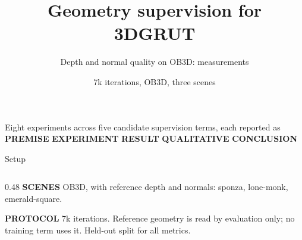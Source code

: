 \documentclass[aspectratio=169,9pt]{beamer}
\title{\bfseries Geometry supervision for 3DGRUT}
\subtitle{Depth and normal quality on OB3D: measurements}
\date{}
\author{7k iterations, OB3D, three scenes}
\makeatletter
\newcommand{\code}[1]{{\ttfamily\fontsize{0.92\f@size}{\f@baselineskip}\selectfont #1}}
\newcommand{\lbl}[1]{\textcolor{lblcol}{\scriptsize\bfseries #1}\hspace{0.5em}}
\makeatother
\begin{document}
\begin{frame}[plain]
  \titlepage
  \vspace{-2.2em}
  \begin{center}\footnotesize
  Eight experiments across five candidate supervision terms, each reported as\\
  \lbl{PREMISE} \lbl{EXPERIMENT} \lbl{RESULT} \lbl{QUALITATIVE} \lbl{CONCLUSION}
  \end{center}
\end{frame}

\begin{frame}{Setup}
  \begin{columns}[T]
    \begin{column}{0.48\textwidth}\small
      \lbl{SCENES} OB3D, with reference depth and normals:
      \code{sponza}, \code{lone-monk}, \code{emerald-square}.

      \lbl{PROTOCOL} 7k iterations. Reference geometry is read by evaluation only; no training
      term uses it. Held-out split for all metrics.


\end{column}
\end{columns}
\end{frame}
\end{document}
